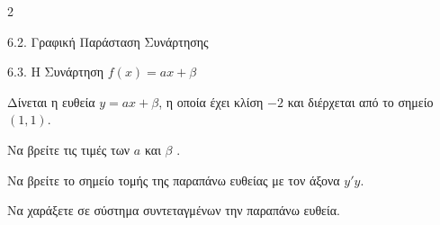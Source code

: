 \begin{ylh}{2}
    \item 6.2. Γραφική Παράσταση Συνάρτησης
    \item 6.3. Η Συνάρτηση $f(x)=ax+\beta$
\end{ylh}
Δίνεται η ευθεία $y = a x + \beta$, η οποία έχει κλίση $-2$ και διέρχεται από το σημείο $(1, 1)$.
\begin{alist}
\item Να βρείτε τις τιμές των $a$ και $\beta$ .
\item Να βρείτε το σημείο τομής της παραπάνω ευθείας με τον άξονα $y'y$.
\item Να χαράξετε σε σύστημα συντεταγμένων την παραπάνω ευθεία.
\end{alist}

